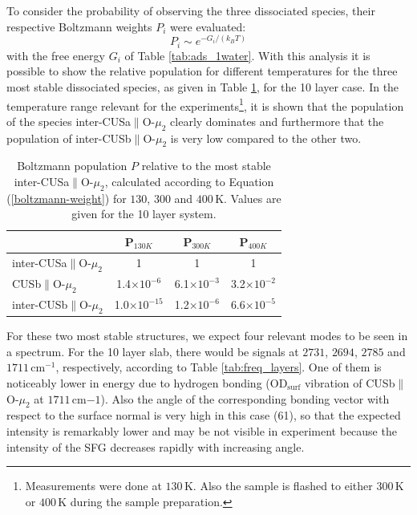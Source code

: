 \documentclass[11pt,DIV=13,BCOR=5mm,a4paper,headinclude]{scrbook}
\begin{document}
To consider the probability of observing the three dissociated species, their respective Boltzmann weights $P_i$ were evaluated:
\begin{equation}\label{boltzmann-weight}
 P_i\sim e^{-G_i/(k_BT)}
\end{equation}
with the free energy $G_i$ of Table \ref{tab:ads_1water}.
With this analysis it is possible to show the relative population for different temperatures for the three most stable dissociated species, as given in Table \ref{tab:boltzmann-pop}, for the 10 layer case.
In the temperature range relevant for the experiments\footnote{Measurements were done at $130\,$K. Also the sample is flashed to either $300\,$K or $400\,$K during the sample preparation.}, it is shown that the population of the species inter-CUSa$\parallel$O-$\mu_2$ clearly dominates and furthermore that the population of inter-CUSb$\parallel$O-$\mu_2$ is very low compared to the other two.
\begin{table}[th]
  \centering
 \caption{Boltzmann population $P$ relative to the most stable inter-CUSa$\parallel$O-$\mu_2$, calculated according to Equation (\ref{boltzmann-weight}) for $130$, $300$ and $400\,$K.
Values are given for the 10 layer system.}
\vspace*{.2cm} 
 \begin{tabular}{l|ccc}
 \toprule
  & P$_{130K}$ & P$_{300K}$ & P$_{400K}$\\\midrule
  inter-CUSa$\parallel$O-$\mu_2$ &1 &1 &1 \\
  CUSb$\parallel$O-$\mu_2$ & 1.4$\times 10^{-6}$& 6.1$\times 10^{-3}$& 3.2$\times 10^{-2}$\\
  inter-CUSb$\parallel$O-$\mu_2$ & 1.0$\times 10^{-15}$ & 1.2$\times 10^{-6}$ & 6.6$\times 10^{-5}$\\\bottomrule
  \end{tabular} 
  \label{tab:boltzmann-pop}
\end{table}


For these two most stable structures, we expect four relevant modes to be seen in a spectrum.
For the 10 layer slab, there would be signals at $2731$, $2694$, $2785$ and $1711\,$cm$^{-1}$, respectively, according to Table \ref{tab:freq_layers}.
One of them is noticeably lower in energy due to hydrogen bonding (OD$_\textrm{surf}$ vibration of CUSb$\parallel$O-$\mu_2$ at $1711\,$cm${-1}$).
Also the angle of the corresponding bonding vector with respect to the surface normal is very high in this case (61\textdegree), so that the expected intensity is remarkably lower and may be not visible in experiment because the intensity of the SFG decreases rapidly with increasing angle\cite{Wirth2014}.
\end{document}
